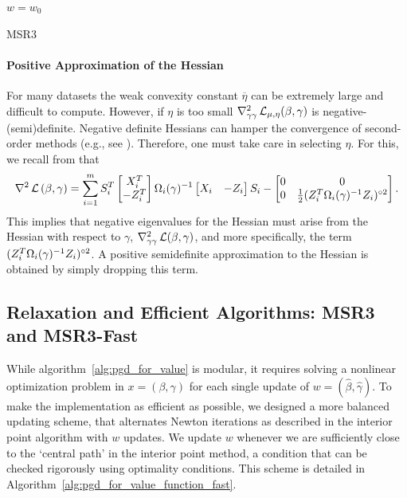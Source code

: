 \begin{algorithm}[H]
\SetAlgoLined
$w = w_0$ \\
 \caption{\label{alg:MSR3} MSR3}
\end{algorithm}



\paragraph{Positive Approximation of the Hessian}
For many datasets the weak convexity constant $\overline \eta$ can be extremely large 
and difficult to compute. However, if $ \eta$ is too small 
$\nabla^2_{\gamma\gamma}\operatorname{\mathcal{L}}_{\mu,\eta}(\beta, \gamma)$ is 
negative-(semi)definite. Negative definite Hessians can hamper the convergence of 
second-order methods (e.g., see \cite{nocedal2006numerical}). 
Therefore, one must take care in selecting $\eta$. For this, we recall from
\cite[Lemma 3]{Theory1} that
\[
\nabla^2\operatorname{\mathcal{L}}{(\beta,\gamma)}=\sum_{i=1}^m
S_i^T\begin{bmatrix}X_i^T\\ -Z_i^T\end{bmatrix}
\Omega_i(\gamma)^{-1}
\begin{bmatrix}X_i& -Z_i\end{bmatrix}S_i
-\begin{bmatrix}
0&0\\ 0& \frac{1}{2}(Z_i^T\Omega_i(\gamma)^{-1}Z_i)^{\circ2}
\end{bmatrix}.
\]
This implies that negative eigenvalues for the Hessian must arise from the
Hessian with respect to $\gamma$,
$\nabla^2_{\gamma\gamma}\operatorname{\mathcal{L}}(\beta, \gamma)$, and more specifically, the
term $(Z_i^T\Omega_i(\gamma)^{-1}Z_i)^{\circ2}$. 
A positive semidefinite approximation to the Hessian is obtained by simply dropping this term. 


\subsection{Relaxation and Efficient Algorithms: MSR3 and MSR3-Fast }
\label{sec:synthetic}

While algorithm~\eqref{alg:pgd_for_value} is modular, it requires solving a nonlinear optimization problem in $x = (\beta, \gamma)$ for each single update
of $w = (\hat \beta, \hat \gamma)$. To make the implementation as efficient as possible, we designed a more balanced updating scheme, that 
alternates Newton iterations as described in the interior point algorithm with $w$ updates. We update $w$ whenever we are sufficiently close 
to the `central path' in the interior point method, a condition that can be checked rigorously using optimality conditions. 
This scheme is detailed in Algorithm~\ref{alg:pgd_for_value_function_fast}.

